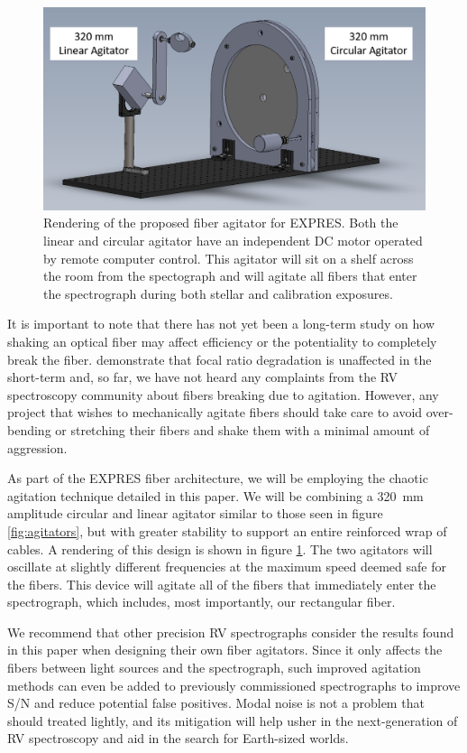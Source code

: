 \documentclass[twocolumn]{emulateapj}
\begin{document}
\begin{figure}
\centering
	\includegraphics[width=\columnwidth]{images/agitator_model.png}
	\caption{Rendering of the proposed fiber agitator for EXPRES. Both the linear and circular agitator have an independent DC motor operated by remote computer control. This agitator will sit on a shelf across the room from the spectograph and will agitate all fibers that enter the spectrograph during both stellar and calibration exposures.}
\label{fig:agitator_model}
\end{figure}

It is important to note that there has not yet been a long-term study on how shaking an optical fiber may affect efficiency or the potentiality to completely break the fiber. \citet{Sablowski2015} demonstrate that focal ratio degradation is unaffected in the short-term and, so far, we have not heard any complaints from the RV spectroscopy community about fibers breaking due to agitation. However, any project that wishes to mechanically agitate fibers should take care to avoid over-bending or stretching their fibers and shake them with a minimal amount of aggression.

As part of the EXPRES fiber architecture, we will be employing the chaotic agitation technique detailed in this paper. We will be combining a \SI{320}{\milli\meter} amplitude circular and linear agitator similar to those seen in figure \ref{fig:agitators}, but with greater stability to support an entire reinforced wrap of cables. A rendering of this design is shown in figure \ref{fig:agitator_model}. The two agitators will oscillate at slightly different frequencies at the maximum speed deemed safe for the fibers. This device will agitate all of the fibers that immediately enter the spectrograph, which includes, most importantly, our rectangular fiber.

We recommend that other precision RV spectrographs consider the results found in this paper when designing their own fiber agitators. Since it only affects the fibers between light sources and the spectrograph, such improved agitation methods can even be added to previously commissioned spectrographs to improve S/N and reduce potential false positives. Modal noise is not a problem that should treated lightly, and its mitigation will help usher in the next-generation of RV spectroscopy and aid in the search for Earth-sized worlds.
\end{document}
